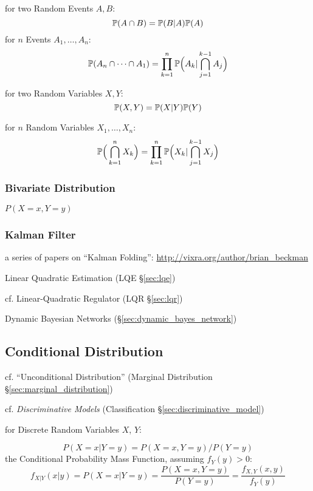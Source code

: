 for two Random Events $A, B$:
\[
  \mathbb{P}(A \cap B) = \mathbb{P}(B | A) \mathbb{P}(A)
\]
for $n$ Events $A_1, \ldots, A_n$:
\[
  \mathbb{P}(A_n \cap \cdots \cap A_1) =
    \prod_{k=1}^n \mathbb{P}\Big(A_k | \bigcap_{j=1}^{k-1} A_j \Big)
\]

for two Random Variables $X, Y$:
\[
  \mathbb{P}(X, Y) = \mathbb{P}(X | Y) \mathbb{P}(Y)
\]

for $n$ Random Variables $X_1, \ldots, X_n$:
\[
  \mathbb{P}\Big(\bigcap_{k=1}^n X_k\Big) =
    \prod_{k=1}^n \mathbb{P}\Big(X_k | \bigcap_{j=1}^{k-1} X_j\Big)
\]



\subsubsection{Bivariate Distribution}\label{sec:bivariate_distribution}

$P(X = x, Y = y)$



\subsubsection{Kalman Filter}\label{sec:kalman_filter}

a series of papers on ``Kalman Folding'':
\url{http://vixra.org/author/brian_beckman}

Linear Quadratic Estimation (LQE \S\ref{sec:lqe})

cf. Linear-Quadratic Regulator (LQR \S\ref{sec:lqr})

\fist Dynamic Bayesian Networks (\S\ref{sec:dynamic_bayes_network})



\subsection{Conditional Distribution}\label{sec:conditional_distribution}

cf. ``Unconditional Distribution'' (Marginal Distribution
\S\ref{sec:marginal_distribution})

cf. \emph{Discriminative Models} (Classification
\S\ref{sec:discriminative_model})

for Discrete Random Variables $X$, $Y$:

\[
  P(X = x | Y = y) = P(X = x, Y = y)/P(Y = y)
\]
the Conditional Probability Mass Function, assuming $f_Y(y) > 0$:
\[
  f_{X|Y}(x|y) = P(X = x|Y = y) =
    \frac{P(X = x, Y = y)}{P(Y = y)} =
    \frac{f_{X,Y}(x,y)}{f_Y(y)}
\]

